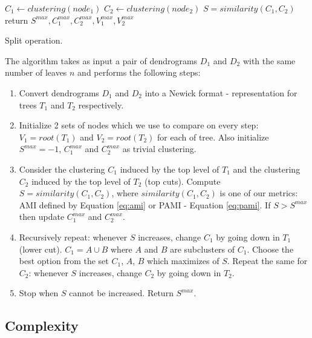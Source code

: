 \begin{algorithm}[h]
	\SetAlgoLined
	 {
		$C_1 \leftarrow clustering(node_1)$ \;
		{$C_2 \leftarrow clustering(node_2)$ \;
			$S = similarity(C_1, C_2)$ \;
		}
		\EndFor
	}
	\EndFor
	return $S^{max},C_1^{max}, C_2^{max}, V_1^{max}, V_2^{max}$ \;
	\caption{Split operation.}
\end{algorithm}

The algorithm takes as input a pair of dendrograms $D_1$ and $D_2$ with the same number of leaves $n$ and performs the following steps:

\begin{enumerate}
	\item Convert dendrograms $D_1$ and $D_2$ into a Newick format \cite{newick1990} - representation for trees $T_1$ and $T_2$ respectively.  
	\item Initialize 2 sets of nodes which we use to compare on every step: $V_1 = root(T_1)$ and $V_2 = root(T_2)$ for each of tree. Also initialize $S^{max}=-1$, $C_1^{max}$ and $C_2^{max}$ as trivial clustering.
	\item Consider the clustering $C_1$ induced by the top level of $T_1$ and the clustering $C_2$ induced by the top level of $T_2$ (top cuts). Compute $S = similarity(C_1, C_2)$, where $similarity(C_1, C_2)$ is one of our metrics: AMI defined by Equation \ref{eq:ami} or PAMI - Equation \ref{eq:pami}. If $S > S^{max}$ then update $C_1^{max}$ and $C_2^{max}$.
	\item Recursively repeat: whenever $S$ increases, change $C_1$ by going down in $T_1$ (lower cut). $C_1 = A \cup B$ where $A$ and $B$ are subclusters of $C_1$. Choose the best option from the set {$C_1$, $A$, $B$} which maximizes of $S$. Repeat the same for $C_2$: whenever $S$ increases, change $C_2$ by going down in $T_2$.
	\item Stop when $S$ cannot be increased. Return $S^{max}$.
\end{enumerate}

\subsection{Complexity}
\label{complexity}

